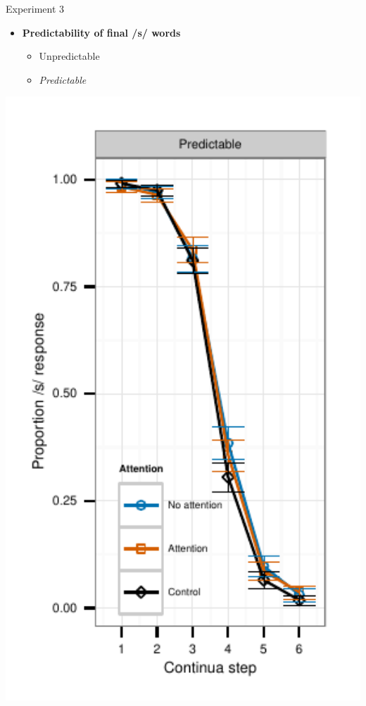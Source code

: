 \documentclass{beamer}
\begin{document}
\begin{frame}{Experiment 3}
\begin{minipage}{0.45\textwidth}
\begin{itemize}
\item \textbf{Predictability of final /s/ words}
\begin{itemize}
\item Unpredictable
\item \emph{Predictable}
\end{itemize}
\end{itemize}
\end{minipage}
\hfill
\begin{minipage}{0.4\textwidth}
\includegraphics[width=1.0\textwidth]{graphs/exp3_categresults_present2-predictable}
\end{minipage}

\end{frame}
\end{document}
